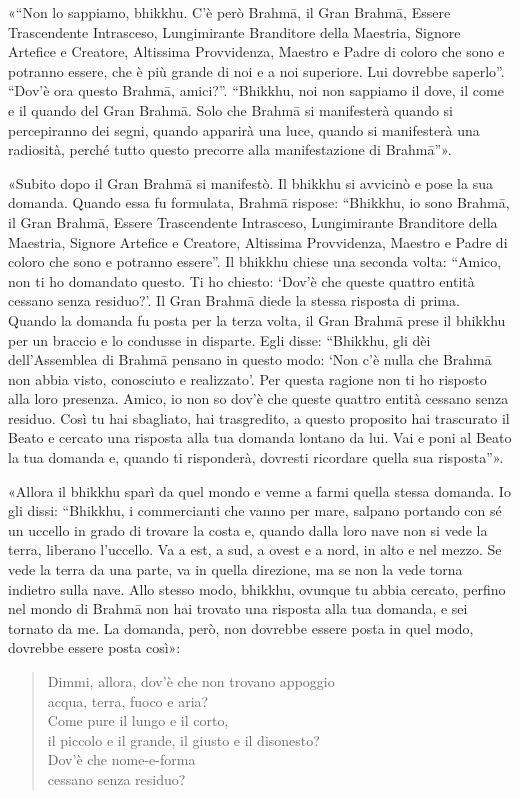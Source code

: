  «“Non lo sappiamo, bhikkhu. C’è però Brahmā, il Gran Brahmā,
Essere Trascendente Intrasceso, Lungimirante Branditore della Maestria, Signore
Artefice e Creatore, Altissima Provvidenza, Maestro e Padre di coloro che sono e
potranno essere, che è più grande di noi e a noi superiore. Lui dovrebbe
saperlo”. “Dov’è ora questo Brahmā, amici?”. “Bhikkhu, noi non sappiamo il dove,
il come e il quando del Gran Brahmā. Solo che Brahmā si manifesterà quando si
percepiranno dei segni, quando apparirà una luce, quando si manifesterà una
radiosità, perché tutto questo precorre alla manifestazione di Brahmā”».

«Subito dopo il Gran Brahmā si manifestò. Il bhikkhu si avvicinò e pose la sua
domanda. Quando essa fu formulata, Brahmā rispose: “Bhikkhu, io sono Brahmā, il
Gran Brahmā, Essere Trascendente Intrasceso, Lungimirante Branditore della
Maestria, Signore Artefice e Creatore, Altissima Provvidenza, Maestro e Padre di
coloro che sono e potranno essere”. Il bhikkhu chiese una seconda volta: “Amico,
non ti ho domandato questo. Ti ho chiesto: ‘Dov’è che queste quattro entità
cessano senza residuo?’. Il Gran Brahmā diede la stessa risposta di prima.
Quando la domanda fu posta per la terza volta, il Gran Brahmā prese il bhikkhu
per un braccio e lo condusse in disparte. Egli disse: “Bhikkhu, gli dèi
dell’Assemblea di Brahmā pensano in questo modo: ‘Non c’è nulla che Brahmā non
abbia visto, conosciuto e realizzato’. Per questa ragione non ti ho risposto
alla loro presenza. Amico, io non so dov’è che queste quattro entità cessano
senza residuo. Così tu hai sbagliato, hai trasgredito, a questo proposito hai
trascurato il Beato e cercato una risposta alla tua domanda lontano da lui. Vai
e poni al Beato la tua domanda e, quando ti risponderà, dovresti ricordare
quella sua risposta”».

«Allora il bhikkhu sparì da quel mondo e venne a farmi quella stessa domanda. Io
gli dissi: “Bhikkhu, i commercianti che vanno per mare, salpano portando con sé
un uccello in grado di trovare la costa e, quando dalla loro nave non si vede la
terra, liberano l’uccello. Va a est, a sud, a ovest e a nord, in alto e nel
mezzo. Se vede la terra da una parte, va in quella direzione, ma se non la vede
torna indietro sulla nave. Allo stesso modo, bhikkhu, ovunque tu abbia cercato,
perfino nel mondo di Brahmā non hai trovato una risposta alla tua domanda, e sei
tornato da me. La domanda, però, non dovrebbe essere posta in quel modo,
dovrebbe essere posta così»:

\begin{quote}
Dimmi, allora, dov’è che non trovano appoggio \\
acqua, terra, fuoco e aria? \\
Come pure il lungo e il corto, \\
il piccolo e il grande, il giusto e il disonesto? \\
Dov’è che nome-e-forma \\
cessano senza residuo?
\end{quote}

